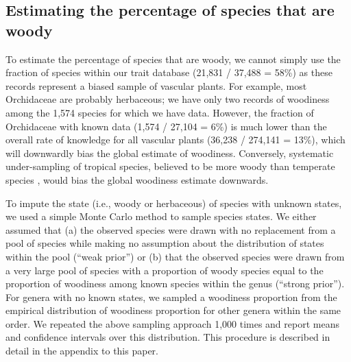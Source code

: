 \documentclass[12pt]{article}
\begin{document}


\subsection{Estimating the percentage of species that are woody}

To estimate the percentage of species that are woody, we cannot simply
use the fraction of species within our trait database (21,831 / 37,488
= 58\%) as these records represent a biased sample of vascular plants.
For example, most Orchidaceae are probably herbaceous; we have only
two records of woodiness among the 1,574 species for which we have
data.
However, the fraction of Orchidaceae with known data (1,574 / 27,104 =
6\%)
is much lower than the overall rate of knowledge for all vascular
plants (36,238 / 274,141 = 13\%), which will downwardly bias the
global estimate of woodiness.
%
Conversely, systematic under-sampling of tropical species, believed to
be more woody than temperate species \citep{Molesheihgt}, would bias
the global woodiness estimate downwards.

To impute the state (i.e., woody or herbaceous) of species with
unknown states, we used a simple Monte Carlo method to sample species
states.  We either assumed that (a) the observed species were drawn
with no replacement from a pool of species while making no assumption
about the distribution of states within the pool (``weak prior'') or
(b) that the observed species were drawn from a very large pool of
species with a proportion of woody species equal to the proportion of
woodiness among known species within the genus (``strong prior'').
%
For genera with no known states, we sampled a woodiness proportion
from the empirical distribution of woodiness proportion for other
genera within the same order.
%
We repeated the above sampling approach 1,000 times and report means
and confidence intervals over this distribution.
%
This procedure is described in detail in the appendix to this paper.
\end{document}
